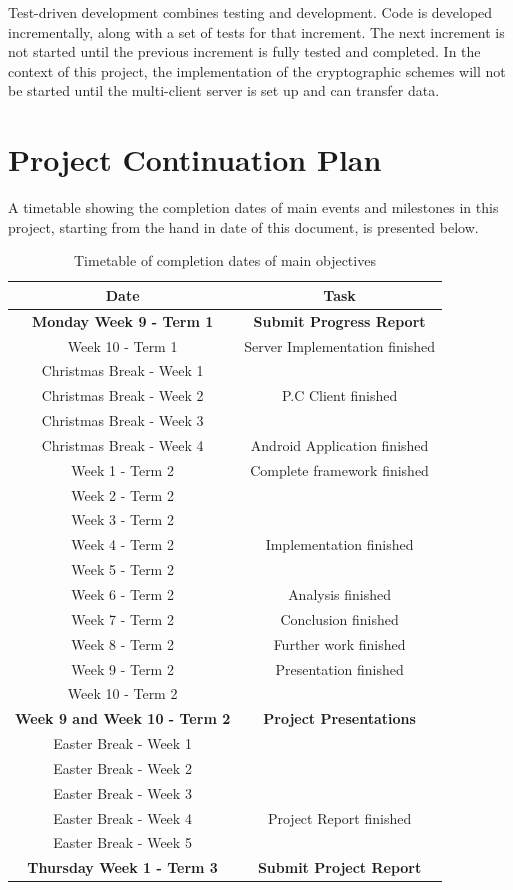 \documentclass[a4paper,11pt]{article}
\begin{document}
Test-driven development combines testing and development. Code is developed incrementally, along with a set of tests for that increment. The next increment is not started until the previous increment is fully tested and completed. In the context of this project, the implementation of the cryptographic schemes will not be started until the multi-client server is set up and can transfer data. 

\section{Project Continuation Plan}

A timetable showing the completion dates of main events and milestones in this project, starting from the hand in date of this document, is presented below.

\begin{table}[htbp]
\begin{tabular}{|c|c|}
\hline
Date & Task \\ \hline
\textbf{Monday Week 9 - Term 1} & \textbf{Submit Progress Report} \\ \hline
Week 10 - Term 1 & Server Implementation finished \\ \hline
Christmas Break - Week 1 &  \\ \hline
Christmas Break - Week 2 & P.C Client finished \\ \hline
Christmas Break - Week 3 &  \\ \hline
Christmas Break - Week 4 & Android Application finished \\ \hline
Week 1 - Term 2 & Complete framework finished \\ \hline
Week 2 - Term 2 &  \\ \hline
Week 3 - Term 2 &  \\ \hline
Week 4 - Term 2 & Implementation finished \\ \hline
Week 5 - Term 2 &  \\ \hline
Week 6 - Term 2 & Analysis finished \\ \hline
Week 7 - Term 2 & Conclusion finished \\ \hline
Week 8 - Term 2 & Further work finished \\ \hline
Week 9 - Term 2 & Presentation finished \\ \hline
Week 10 - Term 2 &  \\ \hline
\textbf{Week 9 and Week 10 - Term 2} & \textbf{Project Presentations} \\ \hline
Easter Break - Week 1 &  \\ \hline
Easter Break - Week 2 &  \\ \hline
Easter Break - Week 3 &  \\ \hline
Easter Break - Week 4 & Project Report finished \\ \hline
Easter Break - Week 5 &  \\ \hline
\textbf{Thursday Week 1 - Term 3} & \textbf{Submit Project Report} \\ \hline
\end{tabular}
\caption{Timetable of completion dates of main objectives}
\label{timetable}
\end{table}
\end{document}
